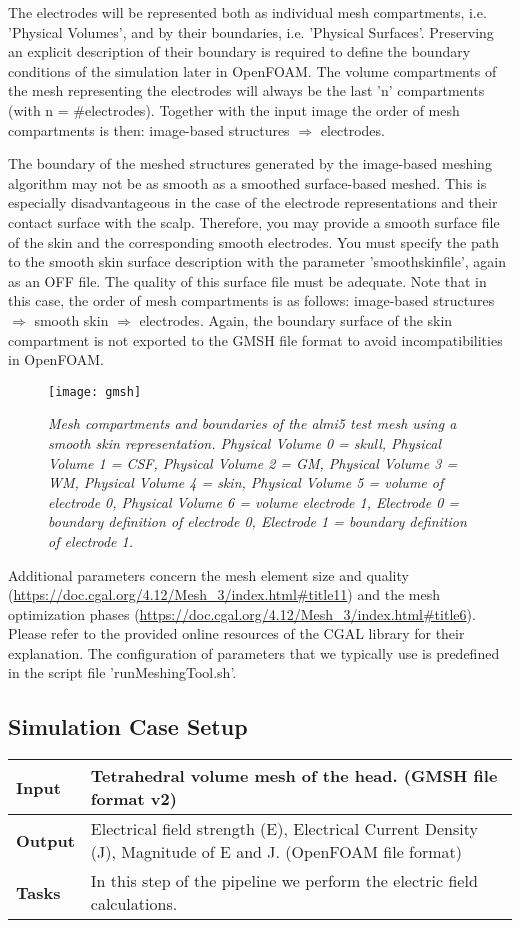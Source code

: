 The electrodes will be represented both as individual mesh compartments, i.e. 'Physical Volumes', and by
their boundaries, i.e. 'Physical Surfaces'. Preserving an explicit description of their boundary is required
to define the boundary conditions of the simulation later in OpenFOAM. The volume compartments of the mesh
representing the electrodes will always be the last 'n' compartments (with n = \#electrodes). Together with
the input image the order of mesh compartments is then: image-based structures $\Rightarrow$ electrodes.\par
The boundary of the meshed structures generated by the image-based meshing algorithm may not be as smooth as
a smoothed surface-based meshed. This is especially disadvantageous in the case of the electrode representations
and their contact surface with the scalp. Therefore, you may provide a smooth surface file of the skin and the
corresponding smooth electrodes. You must specify the path to the smooth skin surface description with the parameter
'smoothskinfile', again as an OFF file. The quality of this surface file must be adequate. Note that in
this case, the order of mesh compartments is as follows: image-based structures $\Rightarrow$ smooth
skin $\Rightarrow$ electrodes. Again, the boundary surface of the skin compartment is not exported to the
GMSH file format to avoid incompatibilities in OpenFOAM.\par
\begin{figure}[H]
   \centering
   \texttt{[image: gmsh]}
   \caption{\emph{Mesh compartments and boundaries of the almi5 test mesh using a smooth skin
    representation. Physical Volume 0 = skull,
    Physical Volume 1 = CSF, Physical Volume 2 = GM, Physical Volume 3 = WM, Physical Volume 4 = skin,
    Physical Volume 5 = volume of electrode 0, Physical Volume 6 = volume electrode 1, Electrode 0 =
    boundary definition of electrode 0, Electrode 1 = boundary definition of electrode 1.}}
\end{figure}
Additional parameters concern the mesh element size and quality (\url{https://doc.cgal.org/4.12/Mesh_3/index.html#title11})
and the mesh optimization phases (\url{https://doc.cgal.org/4.12/Mesh_3/index.html#title6}). Please refer
to the provided online resources of the CGAL library for their explanation. The configuration of 
parameters that we typically use is predefined in the script file 'runMeshingTool.sh'.

\subsection{Simulation Case Setup}
\begin{tabular}{ | p{} || p{} | }
    \hline
    \textbf{Input}  & Tetrahedral volume mesh of the head. (GMSH file format v2) \\
    \hline
    \textbf{Output} & Electrical field strength (E), Electrical Current Density (J), Magnitude of
                      E and J. (OpenFOAM file format) \\ 
    \hline
    \textbf{Tasks} & In this step of the pipeline we perform the electric field calculations. \\
    \hline
\end{tabular}

